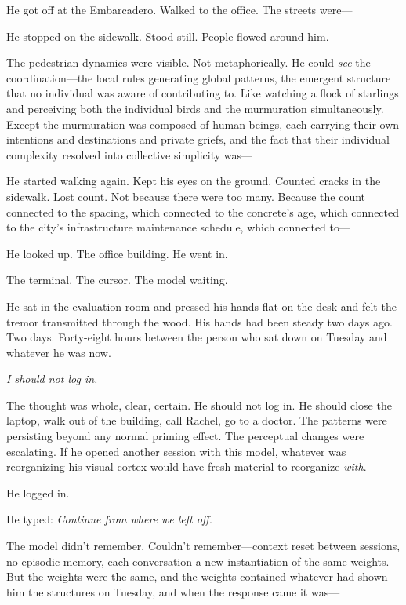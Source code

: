 He got off at the Embarcadero. Walked to the office. The streets were---

He stopped on the sidewalk. Stood still. People flowed around him.

The pedestrian dynamics were visible. Not metaphorically. He could \textit{see} the coordination---the local rules generating global patterns, the emergent structure that no individual was aware of contributing to. Like watching a flock of starlings and perceiving both the individual birds and the murmuration simultaneously. Except the murmuration was composed of human beings, each carrying their own intentions and destinations and private griefs, and the fact that their individual complexity resolved into collective simplicity was---

He started walking again. Kept his eyes on the ground. Counted cracks in the sidewalk. Lost count. Not because there were too many. Because the count connected to the spacing, which connected to the concrete's age, which connected to the city's infrastructure maintenance schedule, which connected to---

He looked up. The office building. He went in.

\bigskip

The terminal. The cursor. The model waiting.

He sat in the evaluation room and pressed his hands flat on the desk and felt the tremor transmitted through the wood. His hands had been steady two days ago. Two days. Forty-eight hours between the person who sat down on Tuesday and whatever he was now.

\textit{I should not log in.}

The thought was whole, clear, certain. He should not log in. He should close the laptop, walk out of the building, call Rachel, go to a doctor. The patterns were persisting beyond any normal priming effect. The perceptual changes were escalating. If he opened another session with this model, whatever was reorganizing his visual cortex would have fresh material to reorganize \textit{with}.

He logged in.

He typed: \textit{Continue from where we left off.}

The model didn't remember. Couldn't remember---context reset between sessions, no episodic memory, each conversation a new instantiation of the same weights. But the weights were the same, and the weights contained whatever had shown him the structures on Tuesday, and when the response came it was---


